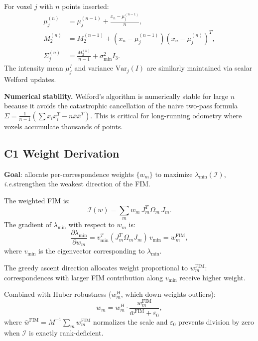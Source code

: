 \documentclass[journal,letterpaper,10pt]{IEEEtran}
\newcommand{\ie}{\textit{i.e.}}
\begin{document}
For voxel $j$ with $n$ points inserted:
\begin{align}
  \mu_j^{(n)} &= \mu_j^{(n-1)} + \frac{x_n - \mu_j^{(n-1)}}{n}, \\
  M_2^{(n)} &= M_2^{(n-1)} + (x_n - \mu_j^{(n-1)})(x_n - \mu_j^{(n)})^T, \\
  \Sigma_j^{(n)} &= \frac{M_2^{(n)}}{n-1} + \sigma_{\min}^2 I_3.
\end{align}
The intensity mean $\mu_j^I$ and variance $\mathrm{Var}_j(I)$ are
similarly maintained via scalar Welford updates.

\textbf{Numerical stability.}
Welford's algorithm is numerically stable for large $n$ because it
avoids the catastrophic cancellation of the naive two-pass formula
$\Sigma = \frac{1}{n-1}(\sum x_i x_i^T - n\bar{x}\bar{x}^T)$.
This is critical for long-running odometry where voxels accumulate
thousands of points.

\subsection{C1 Weight Derivation}\label{app:c1}

\textbf{Goal}: allocate per-correspondence weights $\{w_m\}$ to
maximize $\lambda_{\min}(\mathcal{I})$, \ie strengthen the weakest
direction of the FIM.

The weighted FIM is:
\begin{equation}
  \mathcal{I}(w) = \sum_m w_m\, J_m^T \Omega_m\, J_m.
\end{equation}
The gradient of $\lambda_{\min}$ with respect to $w_m$ is:
\begin{equation}
  \frac{\partial \lambda_{\min}}{\partial w_m}
  = v_{\min}^T (J_m^T \Omega_m J_m)\, v_{\min}
  = w_m^{\mathrm{FIM}},
\end{equation}
where $v_{\min}$ is the eigenvector corresponding to $\lambda_{\min}$.

The greedy ascent direction allocates weight proportional to
$w_m^{\mathrm{FIM}}$: correspondences with larger FIM contribution
along $v_{\min}$ receive higher weight.

Combined with Huber robustness ($w_m^H$, which down-weights outliers):
\begin{equation}
  w_m = w_m^H \cdot \frac{w_m^{\mathrm{FIM}}}{\bar{w}^{\mathrm{FIM}} + \varepsilon_0},
\end{equation}
where $\bar{w}^{\mathrm{FIM}} = M^{-1}\sum_m w_m^{\mathrm{FIM}}$ normalizes
the scale and $\varepsilon_0$ prevents division by zero when
$\mathcal{I}$ is exactly rank-deficient.
\end{document}
